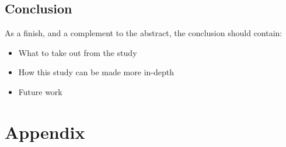 \documentclass[runningheads,a4paper,oribibl]{llncs}
\begin{document}
\subsection{Conclusion}
As a finish, and a complement to the abstract, the conclusion should contain:
\begin{itemize}
	\item What to take out from the study
	\item How this study can be made more in-depth
	\item Future work
\end{itemize}






% 



\newpage
\appendix

\section{Appendix}


\end{document}
